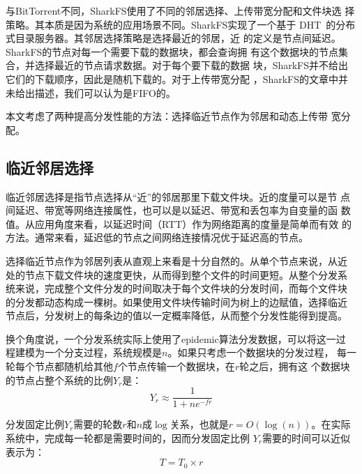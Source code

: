 与BitTorrent不同，SharkFS使用了不同的邻居选择、上传带宽分配和文件块选
择策略。其本质是因为系统的应用场景不同。SharkFS实现了一个基于
DHT~\cite{coral}的分布式目录服务器。其邻居选择策略是选择最近的邻居，近
的定义是节点间延迟。SharkFS的节点对每一个需要下载的数据块，都会查询拥
有这个数据块的节点集合，并选择最近的节点请求数据。对于每个要下载的数据
块，SharkFS并不给出它们的下载顺序，因此是随机下载的。对于上传带宽分配
，SharkFS的文章中并未给出描述，我们可以认为是FIFO的。

% 



本文考虑了两种提高分发性能的方法：选择临近节点作为邻居和动态上传带
宽分配。

\subsection{临近邻居选择}


临近邻居选择是指节点选择从“近”的邻居那里下载文件块。近的度量可以是节
点间延迟、带宽等网络连接属性，也可以是以延迟、带宽和丢包率为自变量的函
数值。从应用角度来看，以延迟时间（RTT）作为网络距离的度量是简单而有效
的方法。通常来看，延迟低的节点之间网络连接情况优于延迟高的节点。


选择临近节点作为邻居列表从直观上来看是十分自然的。从单个节点来说，从近
处的节点下载文件块的速度更快，从而得到整个文件的时间更短。从整个分发系
统来说，完成整个文件分发的时间取决于每个文件块的分发时间，而每个文件块
的分发都动态构成一棵树。如果使用文件块传输时间为树上的边赋值，选择临近
节点后，分发树上的每条边的值以一定概率降低，从而整个分发性能得到提高。

换个角度说，一个分发系统实际上使用了epidemic算法分发数据，可以将这一过
程建模为一个分支过程，系统规模是$n$。如果只考虑一个数据块的分发过程，
每一轮每个节点都随机给其他$f$个节点传输一个数据块，在$r$轮之后，拥有这
个数据块的节点占整个系统的比例$Y_r$是：
\begin{equation*}
\label{equ:epidemic}
Y_r \approx \frac{1}{1+ne^{-fr}} 
\end{equation*}

分发固定比例$Y_r$需要的轮数$r$和$n$成$\log$关系，也就是$r =
O(\log(n))$。在实际系统中，完成每一轮都是需要时间的，因而分发固定比例
$Y_r$需要的时间可以近似表示为：
\begin{equation*}
T = T_0 \times r
\end{equation*}

